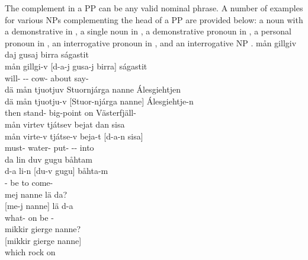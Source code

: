 The complement in a PP can be any valid nominal phrase. A number of examples for various NPs complementing the head of a PP are provided below: %
a noun with a demonstrative in , a single noun in , a demonstrative pronoun in , a personal pronoun in , an interrogative pronoun in , and an interrogative NP .
\ea\label{PPex1}%
\glll	mån gillgiv daj gusaj birra ságastit\\
	mån gillgi-v [d-a-j gusa-j {birra]\subPP} ságastit\\
	 will- -- cow- about say-\\\nopagebreak
{}	
\z
\ea\label{PPex2}%
\glll	dä mån tjuotjuv Stuornjárga nanne Álesgiehtjen\\
	dä mån tjuotju-v [Stuor-njárga {nanne]\subPP} Álesgiehtje-n\\
	then  stand- big-point\BS{} on Västerfjäll-\\\nopagebreak
{}	
\z
\ea\label{PPex3}%
\glll	mån virtev tjátsev bejat dan sisa\\
	mån virte-v tjátse-v beja-t [d-a-n {sisa]\subPP}\\
	 must- water- put- -- into\\\nopagebreak
{}	
\z
\ea\label{PPex4}%
\glll	da lin duv gugu båhtam\\
	d-a li-n [du-v {gugu]\subPP} båhta-m\\
	-\BS{} be\BS{}  to come-\\\nopagebreak
{}	
\z
\ea\label{PPex5}%
\glll	mej nanne lä da?\\
	[me-j {nanne]\subPP} lä d-a\\
	what- on be\BS{} -\BS{}\\
{}	
\z
\ea\label{PPex6}%
\glll	mikkir gierge nanne?\\
	[mikkir gierge {nanne]\subPP}\\
	which rock\BS{} on\\\nopagebreak
{}	
\z

